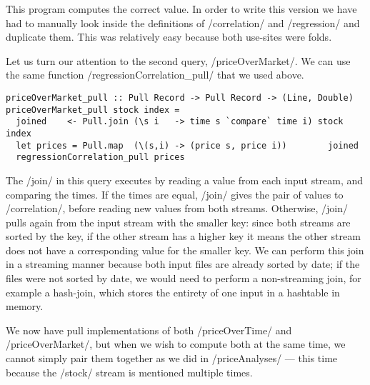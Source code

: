 This program computes the correct value.
In order to write this version we have had to manually look inside the definitions of \Hs/correlation/ and \Hs/regression/ and duplicate them.
This was relatively easy because both use-sites were folds.


Let us turn our attention to the second query, \Hs/priceOverMarket/.
We can use the same function \Hs/regressionCorrelation_pull/ that we used above.

\begin{lstlisting}
priceOverMarket_pull :: Pull Record -> Pull Record -> (Line, Double)
priceOverMarket_pull stock index =
  joined    <- Pull.join (\s i   -> time s `compare` time i) stock index
  let prices = Pull.map  (\(s,i) -> (price s, price i))        joined
  regressionCorrelation_pull prices
\end{lstlisting}


The \Hs/join/ in this query executes by reading a value from each input stream, and comparing the times.
If the times are equal, \Hs/join/ gives the pair of values to \Hs/correlation/, before reading new values from both streams.
Otherwise, \Hs/join/ pulls again from the input stream with the smaller key: since both streams are sorted by the key, if the other stream has a higher key it means the other stream does not have a corresponding value for the smaller key.
We can perform this join in a streaming manner because both input files are already sorted by date; if the files were not sorted by date, we would need to perform a non-streaming join, for example a hash-join, which stores the entirety of one input in a hashtable in memory.

We now have pull implementations of both \Hs/priceOverTime/ and \Hs/priceOverMarket/, but when we wish to compute both at the same time, we cannot simply pair them together as we did in \Hs/priceAnalyses/ --- this time because the \Hs/stock/ stream is mentioned multiple times.


